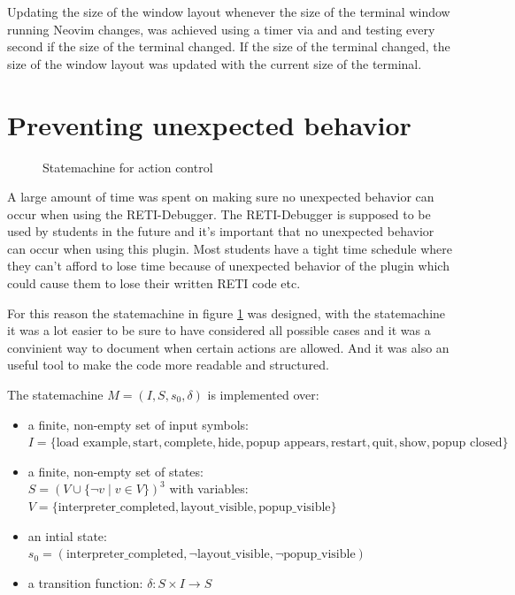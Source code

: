 \documentclass{report}
\begin{document}
Updating the size of the window layout whenever the size of the terminal window running Neovim changes, was achieved using a timer via  and  and testing every second if the size of the terminal changed. If the size of the terminal changed, the size of the window layout was updated with the current size of the terminal.

\section{Preventing unexpected behavior}
\label{sec:unexpected behavior}

\begin{figure}
	\centering
	\caption{Statemachine for action control}
	\label{fig:statemachine}
\end{figure}

A large amount of time was spent on making sure no unexpected behavior can occur when using the RETI-Debugger. The RETI-Debugger is supposed to be used by students in the future and it's important that no unexpected behavior can occur when using this plugin. Most students have a tight time schedule where they can't afford to lose time because of unexpected behavior of the plugin which could cause them to lose their written RETI code etc.

For this reason the \alert{statemachine} in figure \ref{fig:statemachine} was designed, with the statemachine it was a lot easier to be sure to have considered all possible cases and it was a convinient way to document when certain actions are allowed. And it was also an useful tool to make the code more readable and structured.

The statemachine $M = (I, S, s_0, \delta)$ is implemented over:

\begin{itemize}
	\item a finite, non-empty set of \alert{input symbols}:\\
	$I = \{\text{load example}, \text{start}, \text{complete}, \text{hide}, \text{popup appears}, \text{restart}, \text{quit}, \text{show}, \text{popup closed}\}$
	\item a finite, non-empty set of \alert{states}:\\
	$S = (V \cup \{\neg v \mid v\in V\})^3$ with \alert{variables}:\\$V = \{\text{interpreter\_completed}, \text{layout\_visible}, \text{popup\_visible}\}$
	\item an \alert{intial state}:\\$s_0 = (\text{interpreter\_completed}, \neg\text{layout\_visible}, \neg\text{popup\_visible})$
		\item a \alert{transition function}: $\delta: S \times I \rightarrow S$
\end{itemize}
\end{document}
